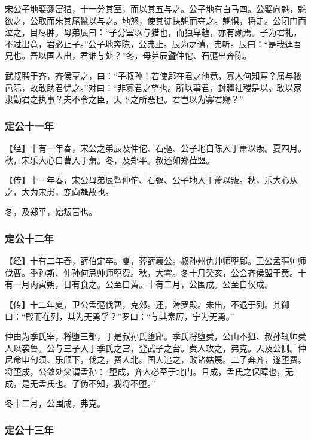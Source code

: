 \documentclass[]{article}
\begin{document}
宋公子地嬖蘧富猎，十一分其室，而以其五与之。公子地有白马四。公嬖向魋，魋欲之，公取而朱其尾鬣以与之。地怒，使其徒扶魋而夺之。魋惧，将走。公闭门而泣之，目尽肿。母弟辰曰：``子分室以与猎也，而独卑魋，亦有颇焉。子为君礼，不过出竟，君必止子。''公子地奔陈，公弗止。辰为之请，弗听。辰曰：``是我迋吾兄也。吾以国人出，君谁与处？''冬，母弟辰暨仲佗、石彄出奔陈。

武叔聘于齐，齐侯享之，曰：``子叔孙！若使郈在君之他竟，寡人何知焉？属与敝邑际，故敢助君忧之。''对曰：``非寡君之望也。所以事君，封疆社稷是以。敢以家隶勤君之执事？夫不令之臣，天下之所恶也。君岂以为寡君赐？''

\hypertarget{header-n2996}{%
\subsubsection{定公十一年}\label{header-n2996}}

【经】十有一年春，宋公之弟辰及仲佗、石彄、公子地自陈入于萧以叛。夏四月。秋，宋乐大心自曹入于萧。冬，及郑平。叔还如郑莅盟。

【传】十一年春，宋公母弟辰暨仲佗、石彄、公子地入于萧以叛。秋，乐大心从之，大为宋患，宠向魋故也。

冬，及郑平，始叛晋也。

\hypertarget{header-n3002}{%
\subsubsection{定公十二年}\label{header-n3002}}

【经】十有二年春，薛伯定卒。夏，葬薛襄公。叔孙州仇帅师堕郈。卫公孟彄帅师伐曹。季孙斯、仲孙何忌帅师堕费。秋，大雩。冬十月癸亥，公会齐侯盟于黄。十有一月丙寅朔，日有食之。公至自黄。十有二月，公围成。公至自侯成。

【传】十二年夏，卫公孟彄伐曹，克郊。还，滑罗殿。未出，不退于列。其御曰：``殿而在列，其为无勇乎？''罗曰：``与其素厉，宁为无勇。''

仲由为季氏宰，将堕三都，于是叔孙氏堕郈。季氏将堕费，公山不狃、叔孙辄帅费人以袭鲁。公与三子入于季氏之宫，登武子之台。费人攻之，弗克。入及公侧。仲尼命申句须、乐颀下，伐之，费人北。国人追之，败诸姑蔑。二子奔齐，遂堕费。将堕成，公敛处父谓孟孙：``堕成，齐人必至于北门。且成，孟氏之保障也，无成，是无孟氏也。子伪不知，我将不堕。''

冬十二月，公围成，弗克。

\hypertarget{header-n3009}{%
\subsubsection{定公十三年}\label{header-n3009}}
\end{document}

